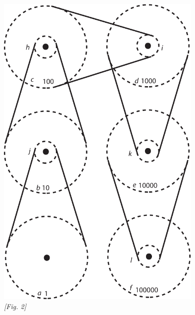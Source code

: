 \newpage
[327~v\textsuperscript{o}]
\begin{center}                    
\includegraphics[width=0.75\textwidth]{images/35_12_1_327v}
\\\textit{[Fig. 2]}
\end{center}
